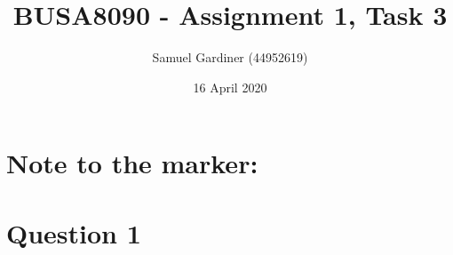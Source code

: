 \documentclass{article}
\title{BUSA8090 - Assignment 1, Task 3}
\author{Samuel Gardiner (44952619)}
\date{16 April 2020}
\begin{document}
\maketitle

\section{Note to the marker:}

\section{Question 1}
\end{document}

